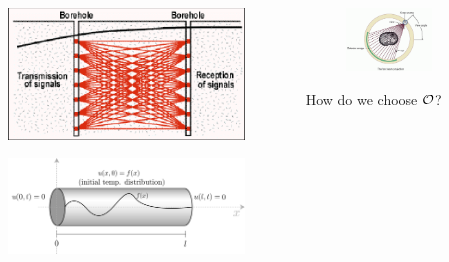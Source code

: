 \documentclass{beamer}
\begin{document}
\begin{frame}
 
  \begin{columns}
    \begin{column}{0.5\textwidth}
      \begin{figure}
        \includegraphics[width=\linewidth]{borehole.png}
      \end{figure}
      \begin{figure}
        \includegraphics[width=\linewidth]{heat_rod.png}
      \end{figure}
    \end{column}
    \begin{column}{0.5\textwidth}
      \begin{figure}
        \includegraphics[width=\linewidth]{CT.png}
      \end{figure}
      How do we choose $\mathcal{O}$?
    \end{column}
  \end{columns}
\end{frame}
\end{document}
